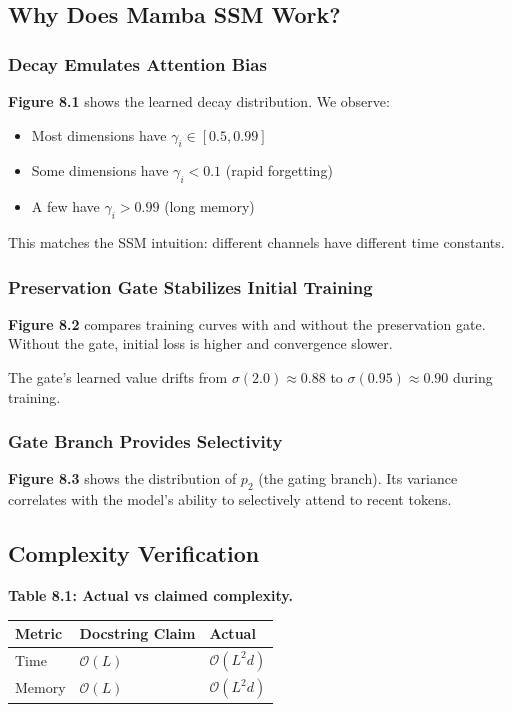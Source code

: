 \subsection{Why Does Mamba SSM Work?}

\subsubsection{Decay Emulates Attention Bias}

\textbf{Figure 8.1} shows the learned decay distribution. We observe:

\begin{itemize}
\item Most dimensions have $\gamma_i \in [0.5, 0.99]$
\item Some dimensions have $\gamma_i < 0.1$ (rapid forgetting)
\item A few have $\gamma_i > 0.99$ (long memory)

\end{itemize}
This matches the SSM intuition: different channels have different time 
constants.

\subsubsection{Preservation Gate Stabilizes Initial Training}

\textbf{Figure 8.2} compares training curves with and without the preservation 
gate. Without the gate, initial loss is higher and convergence slower.

The gate's learned value drifts from $\sigma(2.0) \approx 0.88$ to 
$\sigma(0.95) \approx 0.90$ during training.

\subsubsection{Gate Branch Provides Selectivity}

\textbf{Figure 8.3} shows the distribution of $p_2$ (the gating branch). Its 
variance correlates with the model's ability to selectively attend to 
recent tokens.

\subsection{Complexity Verification}

\textbf{Table 8.1: Actual vs claimed complexity.}

\begin{table}[H]
\centering
\small
\begin{tabular}{lll}
\toprule
\textbf{Metric} & \textbf{Docstring Claim} & \textbf{Actual} \\
\midrule
Time & $\mathcal{O}(L)$ & $\mathcal{O}(L^2 d)$ \\
Memory & $\mathcal{O}(L)$ & $\mathcal{O}(L^2 d)$ \\
\bottomrule
\end{tabular}
\end{table}


